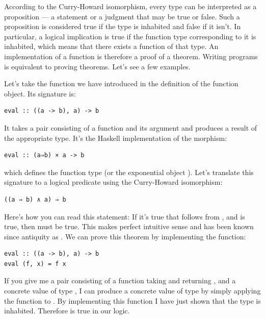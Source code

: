 According to the Curry-Howard isomorphism, every type can be interpreted
as a proposition --- a statement or a judgment that may be true or
false. Such a proposition is considered true if the type is inhabited
and false if it isn't. In particular, a logical implication is true if
the function type corresponding to it is inhabited, which means that
there exists a function of that type. An implementation of a function is
therefore a proof of a theorem. Writing programs is equivalent to
proving theorems. Let's see a few examples.

Let's take the function  we have introduced in the
definition of the function object. Its signature is:

\begin{verbatim}
eval :: ((a -> b), a) -> b
\end{verbatim}

It takes a pair consisting of a function and its argument and produces a
result of the appropriate type. It's the Haskell implementation of the
morphism:

\begin{verbatim}
eval :: (a⇒b) × a -> b
\end{verbatim}

which defines the function type  (or the exponential object
). Let's translate this signature to a logical predicate
using the Curry-Howard isomorphism:

\begin{verbatim}
((a ⇒ b) ∧ a) ⇒ b
\end{verbatim}

Here's how you can read this statement: If it's true that 
follows from , and  is true, then  must be
true. This makes perfect intuitive sense and has been known since
antiquity as . We can prove this theorem by
implementing the function:

\begin{verbatim}
eval :: ((a -> b), a) -> b
eval (f, x) = f x
\end{verbatim}

If you give me a pair consisting of a function  taking
 and returning , and a concrete value  of
type , I can produce a concrete value of type  by
simply applying the function  to . By implementing
this function I have just shown that the type
 is inhabited.
Therefore  is true in our logic.

